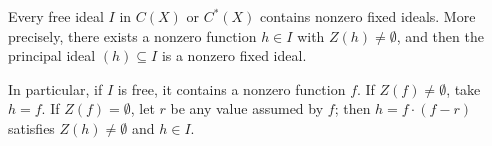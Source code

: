Every free ideal $I$ in $C(X)$ or $C^*(X)$ contains nonzero fixed ideals. More precisely, there exists a nonzero function $h \in I$ with $Z(h) \neq \emptyset$, and then the principal ideal $(h) \subseteq I$ is a nonzero fixed ideal.

In particular, if $I$ is free, it contains a nonzero function $f$. If $Z(f) \neq \emptyset$, take $h = f$. If $Z(f) = \emptyset$, let $r$ be any value assumed by $f$; then $h = f \cdot (f - r)$ satisfies $Z(h) \neq \emptyset$ and $h \in I$.
